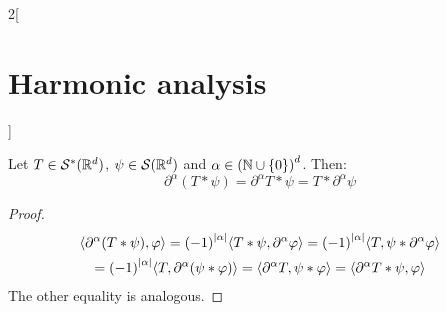 \documentclass[../../../main_math.tex]{subfiles}
\begin{document}
\begin{multicols}{2}[\section{Harmonic analysis}]
  \begin{lemma}
    Let $T\in \mathcal{S}^*(\mathbb{R}^d)$, $\psi\in \mathcal{S}(\mathbb{R}^d)$ and $\alpha\in{(\ensuremath{\mathbb{N}}\cup\{0\})}^d$. Then:
    $$
      \partial^\alpha(T*\psi)=\partial^\alpha T*\psi=T*\partial^\alpha\psi
    $$
  \end{lemma}
  \begin{proof}
    \begin{multline*}
      \langle \partial^\alpha(T*\psi),\varphi\rangle={(-1)}^{\abs{\alpha}}\langle T*\psi,\partial^\alpha\varphi\rangle={(-1)}^{\abs{\alpha}}\langle T,\psi*\partial^\alpha\varphi\rangle\\={(-1)}^{\abs{\alpha}}\langle T,\partial^\alpha(\psi*\varphi)\rangle
      =\langle \partial^\alpha T,\psi*\varphi\rangle   =\langle \partial^\alpha T*\psi,\varphi\rangle
    \end{multline*}
    The other equality is analogous.
  \end{proof}

\end{multicols}
\end{document}
